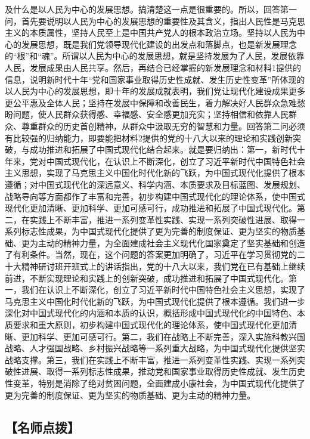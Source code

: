 \documentclass[UTF8,11pt]{ctexart}
\begin{document}
及什么是以人民为中心的发展思想。搞清楚这一点是很重要的。所以，回答第一问，首先要说明以人民为中心的发展思想的重要性及其含义，指出人民性是马克思主义的本质属性，坚持人民至上是中国共产党人的根本政治立场。坚持以人民为中心的发展思想，既是我们党领导现代化建设的出发点和落脚点，也是新发展理念的“根”和“魂”。所谓以人民为中心的发展思想，就是坚持发展为了人民，发展依靠人民，发展成果由人民共享。然后，再结合已经掌握的新发展理念和材料1提供的信息，说明新时代十年“党和国家事业取得历史性成就、发生历史性变革”所体现的以人民为中心的发展思想，即十年的发展成就表明，我们党让现代化建设成果更多更公平惠及全体人民；坚持在发展中保障和改善民生，着力解决好人民群众急难愁盼问题，使人民群众获得感、幸福感、安全感更加充实；坚持相信和依靠人民群众、尊重群众的历史首创精神，从群众中汲取无穷的智慧和力量。回答第二问必须有比较强的归纳能力，即要能把材料2提供的党的十八大以来的理论和实践创新突破，与成功推进和拓展了中国式现代化结合起来。就是要归纳出：第一，新时代十年来，党对中国式现代化，在认识上不断深化，创立了习近平新时代中国特色社会主义思想，实现了马克思主义中国化时代化新的飞跃，为中国式现代化提供了根本遵循；对中国式现代化的深远意义、科学内涵、本质要求及目标蓝图、发展规划、战略导向等方面都作了丰富和完善，初步构建中国式现代化的理论体系，使中国式现代化更加清晰、更加科学、更加可感可行，成功推进和拓展了中国式现代化。第二，在实践上不断丰富，推进一系列变革性实践、实现一系列突破性进展、取得一系列标志性成果，为中国式现代化提供了更为完善的制度保证、更为坚实的物质基础、更为主动的精神力量，为全面建成社会主义现代化国家奠定了坚实基础和创造了有利条件。当然，现在，这个问题的答案更加明确了，习近平在学习贯彻党的二十大精神研讨班开班式上的讲话指出，党的十八大以来，我们党在已有基础上继续前进，不断实现理论和实践上的创新突破，成功推进和拓展了中国式现代化。第一，我们在认识上不断深化，创立了习近平新时代中国特色社会主义思想，实现了马克思主义中国化时代化新的飞跃，为中国式现代化提供了根本遵循。我们进一步深化对中国式现代化的内涵和本质的认识，概括形成中国式现代化的中国特色、本质要求和重大原则，初步构建中国式现代化的理论体系，使中国式现代化更加清晰、更加科学、更加可感可行。第二，我们在战略上不断完善，深入实施科教兴国战略、人才强国战略、乡村振兴战略等一系列重大战略，为中国式现代化提供坚实战略支撑。第三，我们在实践上不断丰富，推进一系列变革性实践、实现一系列突破性进展、取得一系列标志性成果，推动党和国家事业取得历史性成就、发生历史性变革，特别是消除了绝对贫困问题，全面建成小康社会，为中国式现代化提供了更为完善的制度保证、更为坚实的物质基础、更为主动的精神力量。


\subsection*{【名师点拨】}
\end{document}
